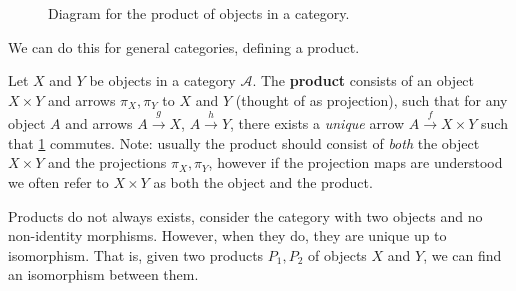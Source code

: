 \begin{figure}[H]
\centering
{}
\caption{Diagram for the product of objects in a category.}
\label{prod}
\end{figure}We can do this for general categories, defining a product.
\begin{definition}[Product]
    Let $X$ and $Y$ be objects in a category $\mathcal{A} $. The \textbf{product} consists of an object $X\times Y$ and arrows $\pi_X,\pi_Y$ to $X$ and $Y$ (thought of as projection), such that for any object $A$ and arrows $A\overset{g}{\to } X$, $A\overset{h}{\to } Y$, there exists a \emph{unique} arrow $A\overset{f}{\to } X\times Y$ such that \cref{prod} commutes. Note: usually the product should consist of \emph{both} the object $X\times Y$ and the projections $\pi_X,\pi_Y$, however if the projection maps are understood we often refer to $X\times Y$ as both the object and the product.
\end{definition}
\begin{claim}
    Products do not always exists, consider the category with two objects and no non-identity morphisms. However, when they do, they are unique up to isomorphism. That is, given two products $P_1,P_2$ of objects $X$ and $Y$, we can find an isomorphism between them. 
\end{claim}
